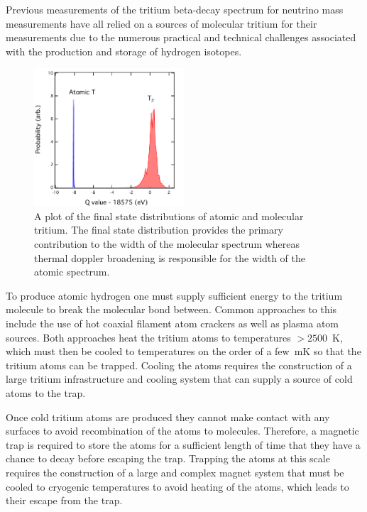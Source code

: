 Previous measurements of the tritium beta-decay spectrum for neutrino mass measurements have all relied on a sources of molecular tritium for their measurements due to the numerous practical and technical challenges associated with the production and storage of hydrogen isotopes.

\begin{figure}[htbp]
    \centering
    \includegraphics*[width=0.5\textwidth]{figs/Chapter-3/atmol2.pdf}
    \caption{\label{fig:chap3-atomic-vs-mol-final-state-spectra} A plot of the final state distributions of atomic and molecular tritium. The final state distribution provides the primary contribution to the width of the molecular spectrum whereas thermal doppler broadening is responsible for the width of the atomic spectrum.}
\end{figure}

To produce atomic hydrogen one must supply sufficient energy to the tritium molecule to break the molecular bond between. Common approaches to this include the use of hot coaxial filament atom crackers as well as plasma atom sources. Both approaches heat the tritium atoms to temperatures $>2500$~K, which must then be cooled to temperatures on the order of a few~mK so that the tritium atoms can be trapped. Cooling the atoms requires the construction of a large tritium infrastructure and cooling system that can supply a source of cold atoms to the trap. 

Once cold tritium atoms are produced they cannot make contact with any surfaces to avoid recombination of the atoms to molecules. Therefore, a magnetic trap is required to store the atoms for a sufficient length of time that they have a chance to decay before escaping the trap. Trapping the atoms at this scale requires the construction of a large and complex magnet system that must be cooled to cryogenic temperatures to avoid heating of the atoms, which leads to their escape from the trap.

